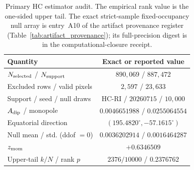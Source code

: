 \documentclass[twocolumn,linenumbers]{aastex702}
\newcommand{\HCRI}{\textsc{HC-RI}}
\begin{document}
\begin{table}[tbp]
\caption{Primary HC estimator audit. The empirical rank value is the one-sided upper tail. The exact strict-sample fixed-occupancy null array is entry~A10 of the artifact provenance register (Table~\ref{tab:artifact_provenance}); its full-precision digest is in the computational-closure receipt.\label{tab:primary_audit}}
\scriptsize
\begin{tabular}{lc}
Quantity & Exact or reported value \\
\hline
$N_{\rm selected}$ / $N_{\rm support}$ & $890{,}069$ / $887{,}472$ \\
Excluded rows / valid pixels & $2{,}597$ / $23{,}633$ \\
Support / seed / null draws & \HCRI{} / $20260715$ / $10{,}000$ \\
$A_{\rm dip}$ / monopole & $0.0046651988$ / $0.0255064554$ \\
Equatorial direction & $(195.4820^\circ,-57.1615^\circ)$ \\
Null mean / std. (ddof $=0$) & $0.0036202914$ / $0.0016464287$ \\
$z_{\rm mom}$ & $+0.6346509$ \\
Upper-tail $k/N$ / rank $p$ & $2376/10000$ / $0.2376762$ \\
\end{tabular}
\end{table}
\end{document}

